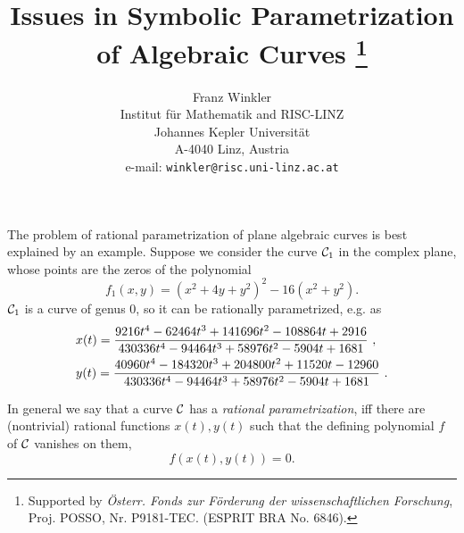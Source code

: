 \oddsidemargin -7mm
\evensidemargin -7mm
\topmargin -05mm
\headheight 0pt
\headsep 0pt
\textheight 235mm
\textwidth 174mm
\pagestyle{empty}



\title{Issues in Symbolic Parametrization
       of Algebraic Curves 
\footnote{Supported by 
{\it \"Osterr. Fonds zur F\"orderung der wissenschaftlichen
Forschung}, Proj. POSSO, Nr. P9181-TEC. (ESPRIT BRA No. 6846).}  }

\author{Franz  Winkler \\
        Institut f\"ur Mathematik and RISC-LINZ \\
        Johannes Kepler Universit\"at \\
        A-4040 Linz, Austria \\
        e-mail: {\tt winkler@risc.uni-linz.ac.at}}

\date{ }

\maketitle

\thispagestyle{empty}

\vspace{4 mm}


\vspace{5 mm}

The problem of rational parametrization of plane algebraic curves is best
explained by an example. 
Suppose we consider the curve ${\cal C}_1$ in the complex plane, whose
points are the zeros of the polynomial
$$f_1(x,y) = (x^2+4y+y^2)^2 - 16(x^2+y^2).$$
${\cal C}_1$ is a curve of genus 0, so it can be rationally 
parametrized, e.g. as
\begin{eqnarray*}
  & x(t) =
          { 9216t^4-62464t^3+141696t^2-108864t+2916 \over
           430336t^4-94464t^3+58976t^2-5904t+1681        }\ , \\
  & y(t) =
          { 40960t^4-184320t^3+204800t^2+11520t-12960 \over
           430336t^4-94464t^3+58976t^2-5904t+1681        }\ .
\end{eqnarray*}


\vspace{2 mm}

In general we say that
a curve $\cal C$ has a {\it rational parametrization}, iff there are 
(nontrivial)
rational functions $x(t),y(t)$ such that the defining polynomial $f$ of
$\cal C$ vanishes on them,
$$f(x(t),y(t))=0.               $$ 

